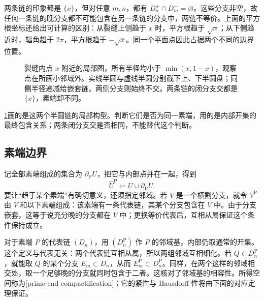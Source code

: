\ProseParagraphBreak
两条链的印象都是 \(\{x\}\)，但对任意 \(m,n\)，都有 \(D_n^+\cap D_m^-=\varnothing\)。这些分支非空，故任何一条链的晚分支都不可能包含在另一条链的分支中，两链不等价。上面的平方根坐标还给出可计算的区别：从裂缝上侧趋于 \(x\) 时，平方根趋于 \(\sqrt x\)；从下侧趋近时，辐角趋于 \(2\pi\)，平方根趋于 \(-\sqrt x\)。同一个平面点因此占据两个不同的边界位置。

\begin{figure}[htbp]
\centering
{}
\caption[裂缝两侧的两个素端]{裂缝内点 \(x\) 附近的局部图，所有半径均小于 \(\min(x,1-x)\)，观察点在所画小邻域外。实线半圆与虚线半圆分别截下上、下半圆盘；同侧半径递减给嵌套链，两侧分支则始终不交。两条链的闭分支交都是 \(\{x\}\)，素端却不同。}
\label{b3:fig:07-slit-prime-ends}
\end{figure}

\cref{b3:fig:07-slit-prime-ends}画的是这两个半圆链的局部构型。判断它们是否为同一素端，用的是内部开集的最终包含关系；两条闭分支交是否相同，不能替代这个判断。

\subsection{素端边界}
\label{b3:subsec:070104}

记全部素端组成的集合为 \(\partial_{\mathrm P}U\)，把它与内部点并在一起，得到
\[
 \widehat U^{\mathrm P}\coloneqq U\cup\partial_{\mathrm P}U.
\]
要让“趋于某个素端”有确切意义，还须指定邻域。若 \(V\) 是一个横割分支，就令 \(V^{\mathrm P}\) 由 \(V\) 和以下素端组成：该素端有一条代表链，其某个分支包含在 \(V\) 中。由于分支嵌套，这等于说充分晚的分支都在 \(V\) 中；更换等价代表后，互相从属保证这个条件保持成立。

\ProseParagraphBreak
对于素端 \(P\) 的代表链 \((D_n)\)，用 \((D_n^{\mathrm P})\) 作 \(P\) 的邻域基，内部仍取通常的开集。这个定义与代表无关：两个代表链互相从属，所以两组邻域互相细化。若 \(Q\in D_n^{\mathrm P}\)，就能取 \(Q\) 的某个分支 \(E_m\subset D_n\)，从而 \(E_m^{\mathrm P}\subset D_n^{\mathrm P}\)。同样，在两个这样的邻域相交处，取一个足够晚的分支就同时包含于二者。这核对了邻域基的相容性。所得空间称为[prime-end compactification]；它的紧性与 Hausdorff 性将由下面的对应定理保证。

